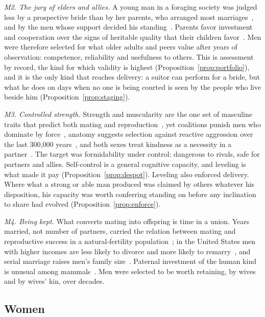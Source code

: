 \emph{M2. The jury of elders and allies.} A young man in a foraging society was judged less by a prospective bride than by her
parents, who arranged most marriages~\cite{walker2011,apostolou2007}, and by the men whose support decided his
standing~\cite{vonrueden2016,henrich2001}. Parents favor investment and cooperation over the signs of heritable quality that their
children favor~\cite{buunk2008}. Men were therefore selected for what older adults and peers value after years of
observation: competence, reliability and usefulness to others. This is assessment by record, the kind for which validity is
highest (Proposition~\ref{prop:portfolio}), and it is the only kind that reaches delivery: a suitor can perform for a
bride, but what he does on days when no one is being courted is seen by the people who live beside him
(Proposition~\ref{prop:staging}).

\emph{M3. Controlled strength.} Strength and muscularity are the one set of masculine traits that predict both mating and
reproduction~\cite{lidborg2022}, yet coalitions punish men who dominate by force~\cite{boehm1993,wrangham2018}, anatomy suggests
selection against reactive aggression over the last 300,000 years~\cite{wrangham2019,cieri2014}, and both sexes treat kindness as a
necessity in a partner~\cite{li2002}. The target was formidability under control: dangerous to rivals, safe for partners and
allies. Self-control is a general cognitive capacity, and leveling is what made it pay (Proposition~\ref{prop:despot}).
Leveling also enforced delivery. Where what a strong or able man produced was claimed by others whatever his disposition,
his capacity was worth conferring standing on before any inclination to share had evolved
(Proposition~\ref{prop:enforce}).

\emph{M4. Being kept.} What converts mating into offspring is time in a union. Years married, not number of partners, carried
the relation between mating and reproductive success in a natural-fertility population~\cite{borgerhoffmulder2019}; in the
United States men with higher incomes are less likely to divorce and more likely to remarry~\cite{hopcroft2021}, and serial
marriage raises men's family size~\cite{jokela2010}. Paternal investment of the human kind is unusual among
mammals~\cite{geary2000,marlowe2000}. Men were selected to be worth retaining, by wives and by wives' kin, over decades.

\subsection{Women}

